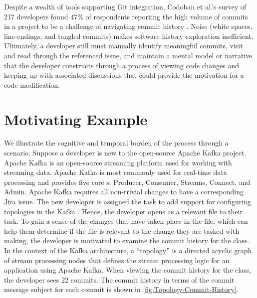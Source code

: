 Despite a wealth of tools supporting Git integration, 
Codoban et al.'s survey of 217 developers found 47\% of respondents reporting the high volume of 
commits in a project to be a challenge of navigating commit history \cite{codoban_software_2015}. 
Noise (\eg white spaces, line-endings, and tangled commits) makes software history exploration inefficient. 
Ultimately, a developer still must manually identify meaningful commits, 
visit and read through the referenced issue, and maintain a mental model or narrative that 
the developer constructs through a process of viewing code changes and keeping up with 
associated discussions that could provide the motivation for a code modification. 


\section{Motivating Example}

We illustrate the cognitive and temporal burden of the process through a scenario.
Suppose a developer is new to the open-source Apache Kafka project. 
Apache Kafka is an open-source streaming platform used for working with streaming data. 
Apache Kafka is most commonly used for real-time data processing and provides five core s: 
Producer, Consumer, Streams, Connect, and Admin.
Apache Kafka requires all non-trivial changes to have a corresponding Jira issue. 
The new developer is assigned the task to add support for configuring topologies in the Kafka .
Hence, the developer opens  as a relevant file to their task.
To gain a sense of the changes that have taken place in the file,
which can help them determine if the file is relevant to the change they are tasked with making,
the developer is motivated to examine the commit history for the  class.
In the context of the Kafka architecture, a ``topology'' is a directed acyclic graph of stream processing nodes 
that defines the stream processing logic for an application using Apache Kafka.
When viewing the commit history for the  class, the developer sees 22 commits.
The commit history in terms of the commit message subject for each commit is shown in \autoref{fig:Topology-Commit-History}.

